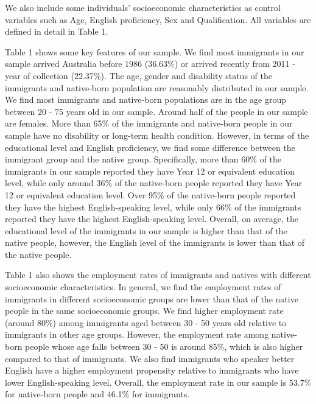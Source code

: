 We also include some individuals’ socioeconomic characteristics as control variables such as Age, English proficiency, Sex and Qualification. All variables are defined in detail in Table 1.

Table 1 shows some key features of our sample.
We find most immigrants in our sample arrived Australia before 1986 (36.63\%) or arrived recently from 2011 - year of collection (22.37\%). 
The age, gender and disability status of the immigrants and native-born population are reasonably distributed in our sample. 
We find most immigrants and native-born populations are in the age group between 20 - 75 years old in our sample. 
Around half of the people in our sample are females. 
More than 65\% of the immigrants and native-born people in our sample have no disability or long-term health condition. 
However, in terms of the educational level and English proficiency, we find some difference between the immigrant group and the native group. 
Specifically, more than 60\% of the immigrants in our sample reported they have Year 12 or equivalent education level, while only around 36\% of the native-born people reported they have Year 12 or equivalent education level.
Over 95\% of the native-born people reported they have the highest English-speaking level, while only 66\% of the immigrants reported they have the highest English-speaking level.
Overall, on average, the educational level of the immigrants in our sample is higher than that of the native people, however, the English level of the immigrants is lower than that of the native people.

Table 1 also shows the employment rates of immigrants and natives with different socioeconomic characteristics. 
In general, we find the employment rates of immigrants in different socioeconomic groups are lower than that of the native people in the same socioeconomic groups. 
We find higher employment rate (around 80\%) among immigrants aged between 30 - 50 years old relative to immigrants in other age groups. 
However, the employment rate among native-born people whose age falls between 30 - 50 is around 85\%, which is also higher compared to that of immigrants. 
We also find immigrants who speaker better English have a higher employment propensity relative to immigrants who have lower English-speaking level.
Overall, the employment rate in our sample is 53.7\% for native-born people and 46.1\% for immigrants. 